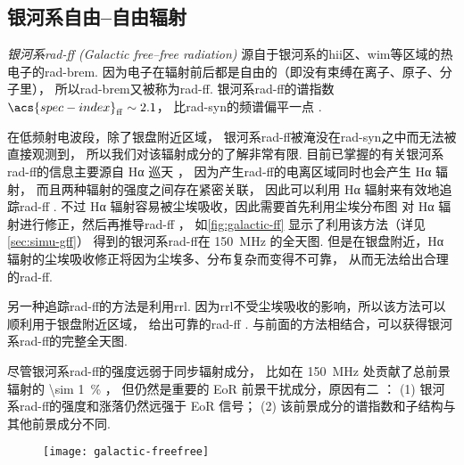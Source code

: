 \subsection{银河系自由--自由辐射}

\emph{银河系\acs{rad-ff} (Galactic free--free radiation)}
源自于银河系的\ac{hii}区、\ac{wim}等区域的热电子的\ac{rad-brem}.
因为电子在辐射前后都是自由的（即没有束缚在离子、原子、分子里），
所以\ac{rad-brem}又被称为\ac{rad-ff}.
银河系\ac{rad-ff}的谱指数 $\acs{spec-index}_{\R{ff}} \sim 2.1$，
比\ac{rad-syn}的频谱偏平一点 \cite{dickinson2003}.

在低频射电波段，除了银盘附近区域，
银河系\ac{rad-ff}被淹没在\ac{rad-syn}之中而无法被直接观测到，
所以我们对该辐射成分的了解非常有限.
目前已掌握的有关银河系\ac{rad-ff}的信息主要源自 Hα 巡天 \cite{finkbeiner2003}，
因为产生\ac{rad-ff}的电离区域同时也会产生 Hα 辐射，
而且两种辐射的强度之间存在紧密关联，
因此可以利用 Hα 辐射来有效地追踪\ac{rad-ff} \cite{smoot1998,dickinson2003}.
不过 Hα 辐射容易被尘埃吸收，因此需要首先利用尘埃分布图\cite{schlegel1998}
对 Hα 辐射进行修正，然后再推导\ac{rad-ff} \cite{dickinson2003}，
如\autoref{fig:galactic-ff} 显示了利用该方法（详见 \autoref{sec:simu-gff}）
得到的银河系\ac{rad-ff}在 \SI{150}{\MHz} 的全天图.
但是在银盘附近，Hα 辐射的尘埃吸收修正将因为尘埃多、分布复杂而变得不可靠，
从而无法给出合理的\ac{rad-ff}.

另一种追踪\ac{rad-ff}的方法是利用\ac{rrl}.
因为\ac{rrl}不受尘埃吸收的影响，所以该方法可以顺利用于银盘附近区域，
给出可靠的\ac{rad-ff} \cite{alves2010,alves2012}.
与前面的方法相结合，可以获得银河系\ac{rad-ff}的完整全天图.

尽管银河系\ac{rad-ff}的强度远弱于同步辐射成分，
比如在 \SI{150}{\MHz} 处贡献了总前景辐射的 \SI{\sim 1}{\percent} \cite{shaver1999}，
但仍然是重要的 EoR 前景干扰成分，原因有二 \cite{jelic2008}：
(1) 银河系\ac{rad-ff}的强度和涨落仍然远强于 EoR 信号；
(2) 该前景成分的谱指数和子结构与其他前景成分不同.

\begin{figure}[tbp]
  \centering
  \texttt{[image: galactic-freefree]}
  \label{fig:galactic-ff}
\end{figure}

